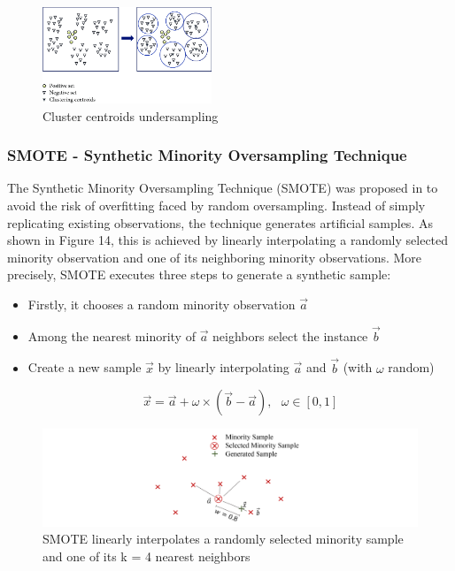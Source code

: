 \documentclass{article}
\begin{document}
\begin{figure}[h]
\centering
\includegraphics[width=0.45\textwidth]{clusterundersampling.png}
\caption{Cluster centroids undersampling \cite{otto}}
\end{figure}

\subsubsection{SMOTE - Synthetic Minority Oversampling Technique}

The Synthetic Minority Oversampling Technique (SMOTE) was proposed in \cite{nove} to avoid the risk of overfitting faced by random oversampling. Instead of simply replicating existing observations, the technique generates artificial samples. As shown in Figure 14, this is achieved by linearly interpolating a randomly selected minority observation and one of its neighboring minority observations. More precisely, SMOTE executes three steps to generate a synthetic sample:

\begin{itemize}
   \item Firstly, it chooses a random minority observation $\vec{a}$
   \item Among the nearest minority of $\vec{a}$ neighbors select the instance $\vec{b}$
   \item Create a new sample $\vec{x}$ by linearly interpolating $\vec{a}$ and $\vec{b}$ (with $\omega$ random)
   
   \begin{equation}
   \vec{x} = \vec{a} + \omega \times (\vec{b} - \vec{a}), ~~~ \omega \in [0,1]
   \end{equation}
\end{itemize}

\begin{figure}[H]
\centering
\includegraphics[width=1\textwidth]{smote.png}
\caption{SMOTE linearly interpolates a randomly selected minority sample and one of its k = 4 nearest neighbors \cite{dieci}}
\end{figure}
\end{document}
